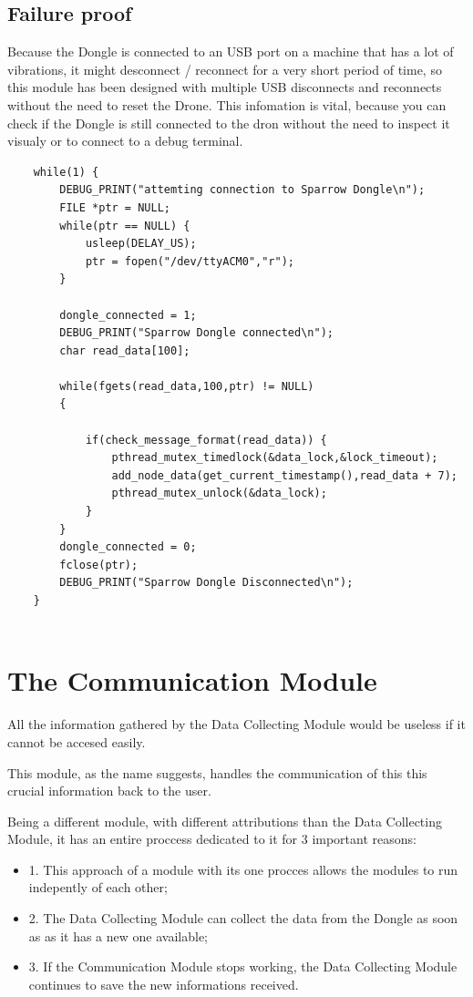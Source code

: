 \subsection{Failure proof}

Because the Dongle is connected to an USB port on a machine that has a lot of vibrations, it might desconnect / reconnect for a very short period of time, so this module has been designed  with multiple USB disconnects and reconnects without the need to reset the Drone. This infomation is vital, because you can check if the Dongle is still connected to the dron without the need to inspect it visualy or to connect to a debug terminal.

\lstset{numbers=none, mathescape=true, nolol=false,caption=Data Collection use of mutex,label=lst:task}
\begin{lstlisting}
	while(1) {
		DEBUG_PRINT("attemting connection to Sparrow Dongle\n");
		FILE *ptr = NULL;	
		while(ptr == NULL) {	
			usleep(DELAY_US);
			ptr = fopen("/dev/ttyACM0","r"); 
		}

		dongle_connected = 1;
		DEBUG_PRINT("Sparrow Dongle connected\n");
		char read_data[100]; 
	 
		while(fgets(read_data,100,ptr) != NULL) 
		{
			
			if(check_message_format(read_data)) {
	   	 		pthread_mutex_timedlock(&data_lock,&lock_timeout); 
				add_node_data(get_current_timestamp(),read_data + 7);
				pthread_mutex_unlock(&data_lock);
			}
		}
		dongle_connected = 0;
		fclose(ptr);
		DEBUG_PRINT("Sparrow Dongle Disconnected\n");	
	}
 
\end{lstlisting}
 

\section{The Communication Module}

All the information gathered by the Data Collecting Module would be useless if it cannot be accesed easily. 

This module, as the name suggests, handles the communication of this this crucial information back to the user.

Being a different module, with different attributions than the Data Collecting Module, it has an entire proccess dedicated to it for 3 important reasons:
\begin{itemize}

\item 1. This approach of a module with its one procces allows the modules to run indepently of each other;
\item 2. The Data Collecting Module can collect the data from the Dongle as soon as as it has a new one available;
\item 3. If the Communication Module stops working, the Data Collecting Module continues to save the new informations received. 

\end{itemize}

